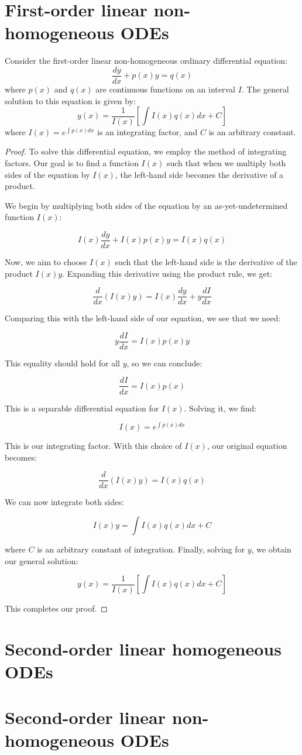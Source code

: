 \section{First-order linear non-homogeneous ODEs}

\begin{theorem}
Consider the first-order linear non-homogeneous ordinary differential equation:
\[
\frac{dy}{dx} + p(x)y = q(x)
\]
where $p(x)$ and $q(x)$ are continuous functions on an interval $I$. The general solution to this equation is given by:
\[
y(x) = \frac{1}{I(x)}\left[\int I(x)q(x)dx + C\right]
\]
where $I(x) = e^{\int p(x)dx}$ is an integrating factor, and $C$ is an arbitrary constant.
\end{theorem}

\begin{proof}
To solve this differential equation, we employ the method of integrating factors. Our goal is to find a function $I(x)$ such that when we multiply both sides of the equation by $I(x)$, the left-hand side becomes the derivative of a product.

We begin by multiplying both sides of the equation by an as-yet-undetermined function $I(x)$:

\[
I(x)\frac{dy}{dx} + I(x)p(x)y = I(x)q(x)
\]

Now, we aim to choose $I(x)$ such that the left-hand side is the derivative of the product $I(x)y$. Expanding this derivative using the product rule, we get:

\[
\frac{d}{dx}(I(x)y) = I(x)\frac{dy}{dx} + y\frac{dI}{dx}
\]

Comparing this with the left-hand side of our equation, we see that we need:

\[
y\frac{dI}{dx} = I(x)p(x)y
\]

This equality should hold for all $y$, so we can conclude:

\[
\frac{dI}{dx} = I(x)p(x)
\]

This is a separable differential equation for $I(x)$. Solving it, we find:

\[
I(x) = e^{\int p(x)dx}
\]

This is our integrating factor. With this choice of $I(x)$, our original equation becomes:

\[
\frac{d}{dx}(I(x)y) = I(x)q(x)
\]

We can now integrate both sides:

\[
I(x)y = \int I(x)q(x)dx + C
\]

where $C$ is an arbitrary constant of integration. Finally, solving for $y$, we obtain our general solution:

\[
y(x) = \frac{1}{I(x)}\left[\int I(x)q(x)dx + C\right]
\]

This completes our proof.
\end{proof}

\section{Second-order linear homogeneous ODEs}

\section{Second-order linear non-homogeneous ODEs}